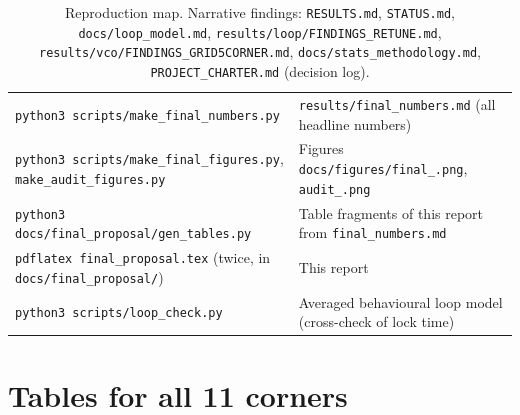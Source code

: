\documentclass[11pt,a4paper]{article}
\newcommand{\vc}{V_{\mathrm{ctrl}}}
\begin{document}
\begin{table}[!htbp]
\begin{tabular}{p{6.6cm}p{8.4cm}}
\texttt{python3 scripts/\allowbreak make\_\allowbreak final\_\allowbreak numbers.py} & \texttt{results/\allowbreak final\_\allowbreak numbers.md} (all headline numbers)\\
\texttt{python3 scripts/\allowbreak make\_\allowbreak final\_\allowbreak figures.py}, \texttt{make\_\allowbreak audit\_\allowbreak figures.py} & Figures \texttt{docs/\allowbreak figures/\allowbreak final\_\allowbreak *.png}, \texttt{audit\_\allowbreak *.png}\\
\texttt{python3 docs/\allowbreak final\_\allowbreak proposal/\allowbreak gen\_\allowbreak tables.py} & Table fragments of this report from \texttt{final\_\allowbreak numbers.md}\\
\texttt{pdflatex final\_\allowbreak proposal.tex} (twice, in \texttt{docs/\allowbreak final\_\allowbreak proposal/\allowbreak }) & This report\\
\texttt{python3 scripts/\allowbreak loop\_\allowbreak check.py} & Averaged behavioural loop model (cross-check of lock time)\\\bottomrule
\end{tabular}
\caption{Reproduction map. Narrative findings: \texttt{RESULTS.md}, \texttt{STATUS.md}, \texttt{docs/\allowbreak loop\_\allowbreak model.md}, \texttt{results/\allowbreak loop/\allowbreak FINDINGS\_\allowbreak RETUNE.md}, \texttt{results/\allowbreak vco/\allowbreak FINDINGS\_\allowbreak GRID5CORNER.md}, \texttt{docs/\allowbreak stats\_\allowbreak methodology.md}, \texttt{PROJECT\_\allowbreak CHARTER.md} (decision log).}
\end{table}

\section{Tables for all 11 corners}
\begin{table}[!htbp]\centering\footnotesize\setlength{\tabcolsep}{4pt}

\caption{Compensation coefficients and spans per corner (nominal, ideal source, fit at $\vc=0.9$\,V). Raw: \texttt{results/comp/factorial/factorial\_comp\_all.json}.}
\end{table}
\end{document}
